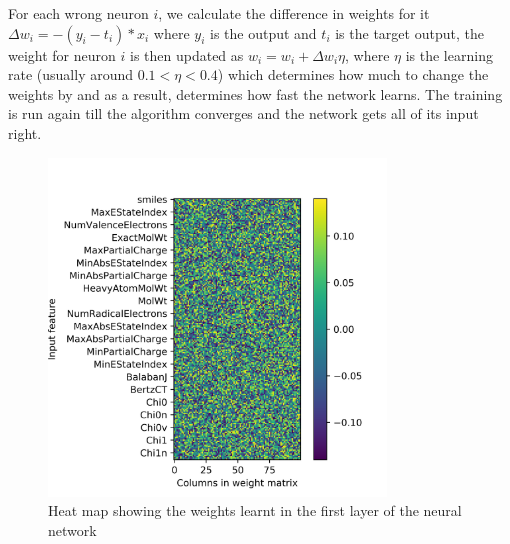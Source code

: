 \documentclass[a4paper,12pt]{report}
\begin{document}
			For each wrong neuron $i$, we calculate the difference in weights for it $\Delta w_i = -(y_i - t_i) * x_i$ where $y_i$ is the output and $t_i$ is the target output, the weight for neuron $i$ is then updated as $w_i = w_i + \Delta w_i\eta$, where $\eta$ is the learning rate (usually around $0.1 < \eta < 0.4$) which determines how much to change the weights by and as a result, determines how fast the network learns. The training is run again till the algorithm converges and the network gets all of its input right.
				
				\begin{figure}[H]
					\centering
					\includegraphics[width=0.8\textwidth,scale=1,totalheight=0.5\textheight]{images/neural_network_activation}
					\caption{Heat map showing the weights learnt in the first layer of the neural network}
					\label{fig:neural_net_activation}
				\end{figure}
				
\end{document}
